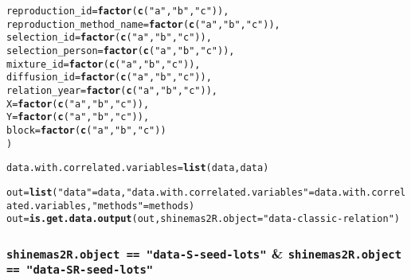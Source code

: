\documentclass{article}\usepackage[]{graphicx}\usepackage[]{color}
\makeatletter
\newcommand{\hlstr}[1]{\textcolor[rgb]{0.192,0.494,0.8}{#1}}%
\newcommand{\hlstd}[1]{\textcolor[rgb]{0.345,0.345,0.345}{#1}}%
\newcommand{\hlkwb}[1]{\textcolor[rgb]{0.69,0.353,0.396}{#1}}%
\newcommand{\hlkwc}[1]{\textcolor[rgb]{0.333,0.667,0.333}{#1}}%
\newcommand{\hlkwd}[1]{\textcolor[rgb]{0.737,0.353,0.396}{\textbf{#1}}}%
\newenvironment{kframe}{%
 \def\at@end@of@kframe{}%
 \ifinner\ifhmode%
  \def\at@end@of@kframe{\end{minipage}}%
  \begin{minipage}{\columnwidth}%
 \fi\fi%
 \def\FrameCommand##1{\hskip\@totalleftmargin \hskip-\fboxsep
 \colorbox{shadecolor}{##1}\hskip-\fboxsep
     \hskip-\linewidth \hskip-\@totalleftmargin \hskip\columnwidth}%
 \MakeFramed {\advance\hsize-\width
   \@totalleftmargin\z@ \linewidth\hsize
   \@setminipage}}%
 {\par\unskip\endMakeFramed%
 \at@end@of@kframe}
\newenvironment{knitrout}{}{} %
\makeatother
\begin{document}
\begin{appendices}
\begin{knitrout}
\begin{kframe}
\begin{alltt}
        \hlkwc{reproduction_id} \hlstd{=} \hlkwd{factor}\hlstd{(}\hlkwd{c}\hlstd{(}\hlstr{"a"}\hlstd{,} \hlstr{"b"}\hlstd{,} \hlstr{"c"}\hlstd{)),}
        \hlkwc{reproduction_method_name} \hlstd{=} \hlkwd{factor}\hlstd{(}\hlkwd{c}\hlstd{(}\hlstr{"a"}\hlstd{,} \hlstr{"b"}\hlstd{,} \hlstr{"c"}\hlstd{)),}
        \hlkwc{selection_id} \hlstd{=} \hlkwd{factor}\hlstd{(}\hlkwd{c}\hlstd{(}\hlstr{"a"}\hlstd{,} \hlstr{"b"}\hlstd{,} \hlstr{"c"}\hlstd{)),}
        \hlkwc{selection_person} \hlstd{=} \hlkwd{factor}\hlstd{(}\hlkwd{c}\hlstd{(}\hlstr{"a"}\hlstd{,} \hlstr{"b"}\hlstd{,} \hlstr{"c"}\hlstd{)),}
        \hlkwc{mixture_id} \hlstd{=} \hlkwd{factor}\hlstd{(}\hlkwd{c}\hlstd{(}\hlstr{"a"}\hlstd{,} \hlstr{"b"}\hlstd{,} \hlstr{"c"}\hlstd{)),}
        \hlkwc{diffusion_id} \hlstd{=} \hlkwd{factor}\hlstd{(}\hlkwd{c}\hlstd{(}\hlstr{"a"}\hlstd{,} \hlstr{"b"}\hlstd{,} \hlstr{"c"}\hlstd{)),}
        \hlkwc{relation_year} \hlstd{=} \hlkwd{factor}\hlstd{(}\hlkwd{c}\hlstd{(}\hlstr{"a"}\hlstd{,} \hlstr{"b"}\hlstd{,} \hlstr{"c"}\hlstd{)),}
        \hlkwc{X} \hlstd{=} \hlkwd{factor}\hlstd{(}\hlkwd{c}\hlstd{(}\hlstr{"a"}\hlstd{,} \hlstr{"b"}\hlstd{,} \hlstr{"c"}\hlstd{)),}
        \hlkwc{Y} \hlstd{=} \hlkwd{factor}\hlstd{(}\hlkwd{c}\hlstd{(}\hlstr{"a"}\hlstd{,} \hlstr{"b"}\hlstd{,} \hlstr{"c"}\hlstd{)),}
        \hlkwc{block} \hlstd{=} \hlkwd{factor}\hlstd{(}\hlkwd{c}\hlstd{(}\hlstr{"a"}\hlstd{,} \hlstr{"b"}\hlstd{,} \hlstr{"c"}\hlstd{))}
        \hlstd{)}

\hlstd{data.with.correlated.variables} \hlkwb{=} \hlkwd{list}\hlstd{(data, data)}

\hlstd{out} \hlkwb{=} \hlkwd{list}\hlstd{(}\hlstr{"data"} \hlstd{= data,} \hlstr{"data.with.correlated.variables"} \hlstd{= data.with.correlated.variables,} \hlstr{"methods"} \hlstd{= methods)}
\hlstd{out} \hlkwb{=} \hlkwd{is.get.data.output}\hlstd{(out,} \hlkwc{shinemas2R.object} \hlstd{=} \hlstr{"data-classic-relation"}\hlstd{)}
\end{alltt}


{\ttfamily\noindent\itshape{}}\end{kframe}
\end{knitrout}



\subsubsection{\texttt{shinemas2R.object == "data-S-seed-lots"} \& \texttt{shinemas2R.object == "data-SR-seed-lots"}}


\end{appendices}
\end{document}
